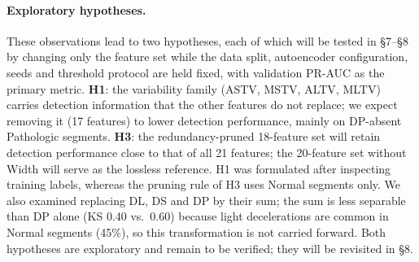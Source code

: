 \paragraph{Exploratory hypotheses.}
These observations lead to two hypotheses, each of which will be tested in
\S7--\S8 by changing
only the feature set while the data split, autoencoder configuration, seeds
and threshold protocol are held fixed, with validation PR-AUC as the primary
metric.
\textbf{H1}: the variability family (ASTV, MSTV, ALTV, MLTV) carries detection
information that the other features do not replace; we expect removing it (17
features) to lower detection performance, mainly on DP-absent Pathologic
segments.
\textbf{H3}: the redundancy-pruned 18-feature set will retain detection
performance close to that of all 21 features; the 20-feature set without Width
will serve as the lossless reference.
H1 was formulated after inspecting training labels, whereas the pruning rule
of H3 uses Normal segments only. We also examined replacing DL, DS and DP by
their sum; the sum is less separable than DP alone (KS 0.40 vs.\ 0.60) because
light decelerations are common in Normal segments (45\%), so this
transformation is not carried forward. Both hypotheses are exploratory and
remain to be verified; they will be revisited in \S8.
